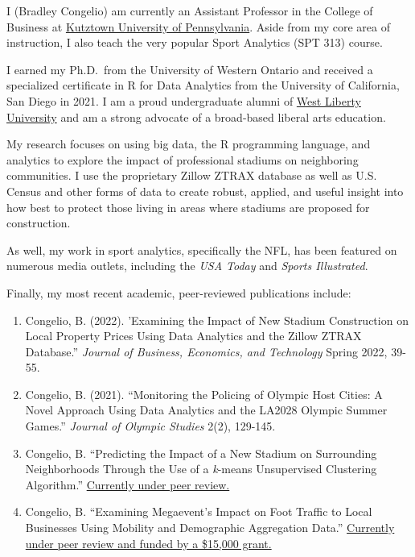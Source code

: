 \documentclass[
  letterpaper,
]{krantz}
\begin{document}

I (Bradley Congelio) am currently an Assistant Professor in the College
of Business at \href{https://www.kutztown.edu/}{Kutztown University of
Pennsylvania}. Aside from my core area of instruction, I also teach the
very popular Sport Analytics (SPT 313) course.

I earned my Ph.D.~from the University of Western Ontario and received a
specialized certificate in R for Data Analytics from the University of
California, San Diego in 2021. I am a proud undergraduate alumni of
\href{https://westliberty.edu/}{West Liberty University} and am a strong
advocate of a broad-based liberal arts education.

My research focuses on using big data, the R programming language, and
analytics to explore the impact of professional stadiums on neighboring
communities. I use the proprietary Zillow ZTRAX database as well as U.S.
Census and other forms of data to create robust, applied, and useful
insight into how best to protect those living in areas where stadiums
are proposed for construction.

As well, my work in sport analytics, specifically the NFL, has been
featured on numerous media outlets, including the \emph{USA Today} and
\emph{Sports Illustrated}.

Finally, my most recent academic, peer-reviewed publications include:

\begin{enumerate}
\def\labelenumi{\arabic{enumi}.}
\item
  Congelio, B. (2022). 'Examining the Impact of New Stadium Construction
  on Local Property Prices Using Data Analytics and the Zillow ZTRAX
  Database.'' \emph{Journal of Business, Economics, and Technology}
  Spring 2022, 39-55.
\item
  Congelio, B. (2021). ``Monitoring the Policing of Olympic Host Cities:
  A Novel Approach Using Data Analytics and the LA2028 Olympic Summer
  Games.'' \emph{Journal of Olympic Studies} 2(2), 129-145.
\item
  Congelio, B. ``Predicting the Impact of a New Stadium on Surrounding
  Neighborhoods Through the Use of a \emph{k}-means Unsupervised
  Clustering Algorithm.'' \ul{Currently under peer review.}
\item
  Congelio, B. ``Examining Megaevent's Impact on Foot Traffic to Local
  Businesses Using Mobility and Demographic Aggregation Data.''
  \ul{Currently under peer review and funded by a \$15,000 grant.}
\end{enumerate}
\end{document}
